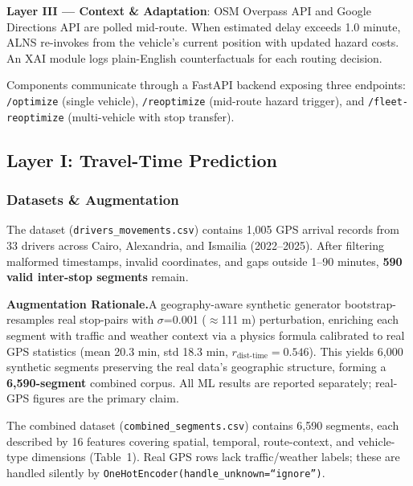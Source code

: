\documentclass[conference]{IEEEtran}
\newcommand{\mar}[1]{\textcolor{black!90!white}{#1}}
\begin{document}
\textbf{Layer III — Context \& Adaptation}: OSM Overpass API and Google
Directions API are polled mid-route. When estimated delay exceeds 1.0 minute,
ALNS re-invokes from the vehicle's current position with updated hazard costs.
An XAI module logs plain-English counterfactuals for each routing decision.

Components communicate through a FastAPI backend exposing three endpoints:
\texttt{/optimize} (single vehicle), \texttt{/reoptimize} (mid-route hazard
trigger), and \texttt{/fleet-reoptimize} (multi-vehicle with stop transfer).

\mar{\subsection{Layer I: Travel-Time Prediction}}

\mar{\subsubsection{Datasets \& Augmentation}}

The dataset (\texttt{drivers\_movements.csv}) contains 1,005 GPS
arrival records from 33 drivers across Cairo, Alexandria, and Ismailia
(2022--2025). After filtering malformed timestamps, invalid coordinates, and
gaps outside 1--90 minutes, \textbf{590 valid inter-stop segments} remain.

\textbf{Augmentation Rationale.}A geography-aware synthetic generator bootstrap-resamples real
stop-pairs with $\sigma$=0.001\textdegree{} ($\approx$111 m) perturbation,
enriching each segment with traffic and weather context via a physics formula
calibrated to real GPS statistics (mean 20.3 min, std 18.3 min,
$r_{\text{dist-time}}\!=\!0.546$). This yields 6,000 synthetic segments
preserving the real data's geographic structure, forming a \textbf{6,590-segment}
combined corpus. All ML results are reported separately; real-GPS figures are
the primary claim.

The combined dataset (\texttt{combined\_segments.csv}) contains 6,590 segments,
each described by 16 features covering spatial, temporal, route-context, and
vehicle-type dimensions (Table~1). Real GPS rows lack traffic/weather labels;
these are handled silently by \texttt{OneHotEncoder(handle\_unknown=``ignore'')}.
\end{document}
